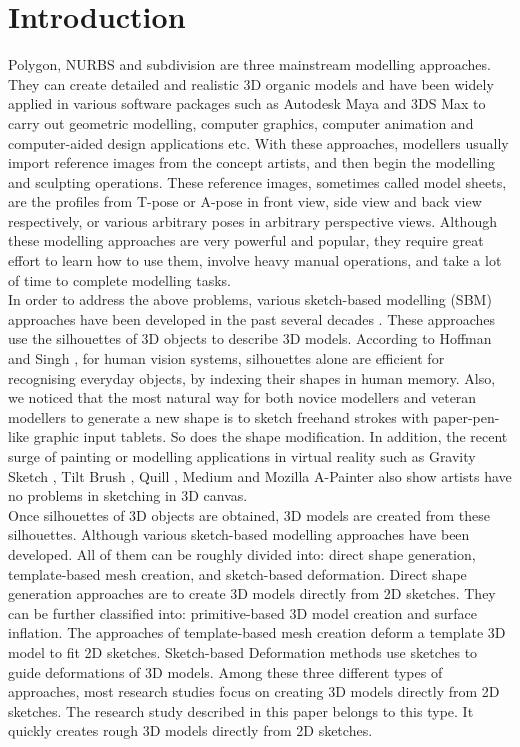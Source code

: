\documentclass[runningheads]{llncs}
\begin{document}
\section{Introduction}
Polygon, NURBS and subdivision are three mainstream modelling approaches. They can create detailed and realistic 3D organic models and have been widely applied in various software packages such as Autodesk Maya and 3DS Max to carry out geometric modelling, computer graphics, computer animation and  computer-aided design applications etc. With these approaches, modellers usually import reference images from the concept artists, and then begin the modelling and sculpting operations. These reference images, sometimes called model sheets, are the profiles from T-pose or A-pose in front view, side view and back view respectively, or various arbitrary poses in arbitrary perspective views. Although these modelling approaches are very powerful and popular, they require great effort to learn how to use them, involve heavy manual operations, and take a lot of time to complete modelling tasks. \\

In order to address the above problems, various sketch-based modelling (SBM) approaches have been developed in the past several decades \cite{olsen2009sketch}. These approaches use the silhouettes of 3D objects to describe 3D models. According to Hoffman and Singh  \cite{hoffman1997salience}, for human vision systems, silhouettes alone are efficient for recognising everyday objects, by indexing their shapes in human memory. Also, we noticed that the most natural way for both novice modellers and veteran modellers to generate a new shape is to sketch freehand strokes with paper-pen-like graphic input tablets. So does the shape modification. In addition, the recent surge of painting or modelling applications in virtual reality such as Gravity Sketch \cite{GravitySketch}, Tilt Brush \cite{TiltBrush}, Quill \cite{Quill}, Medium \cite{OculusMedium} and Mozilla A-Painter \cite{APainter} also show artists have no problems in sketching in 3D canvas.\\

Once silhouettes of 3D objects are obtained, 3D models are created from these silhouettes. Although various sketch-based modelling approaches have been developed. All of them can be roughly divided into: direct shape generation, template-based mesh creation, and sketch-based deformation. Direct shape generation approaches are to create 3D models directly from 2D sketches. They can be further classified into: primitive-based 3D model creation and surface inflation. The approaches of template-based mesh creation deform a template 3D model to fit 2D sketches. Sketch-based Deformation methods use sketches to guide deformations of 3D models. Among these three different types of approaches, most research studies focus on creating 3D models directly from 2D sketches. The research study described in this paper belongs to this type. It quickly creates rough 3D models directly from 2D sketches. \\
\end{document}
